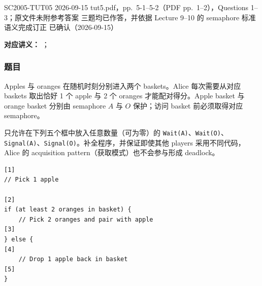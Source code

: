 
\label{tutorial:SC2005-TUT05}

\tutorialmeta
  {SC2005-TUT05}
  {2026-09-15}
  {tut5.pdf，pp.~5-1--5-2（PDF pp.~1--2），Questions 1--3；原文件未附参考答案}
  {三题均已作答，并依据 Lecture 9--10 的 semaphore 标准语义完成订正}
  {已确认（2026-09-15）}


\textbf{对应讲义：}
；

\subsubsection*{题目}

Apples 与 oranges 在随机时刻分别进入两个 baskets。Alice 每次需要从对应 baskets 取出恰好 1 个 apple 与 2 个 oranges 才能配对得分。Apple basket 与 orange basket 分别由 semaphore $A$ 与 $O$ 保护；访问 basket 前必须取得对应 semaphore。

只允许在下列五个框中放入任意数量（可为零）的 \texttt{Wait(A)}、\texttt{Wait(O)}、\texttt{Signal(A)}、\texttt{Signal(O)}。补全程序，并保证即使其他 players 采用不同代码，Alice 的 acquisition pattern（获取模式）也不会参与形成 deadlock。

\begin{verbatim}
[1]
// Pick 1 apple

[2]
if (at least 2 oranges in basket) {
    // Pick 2 oranges and pair with apple
[3]
} else {
[4]
    // Drop 1 apple back in basket
[5]
}
\end{verbatim}

